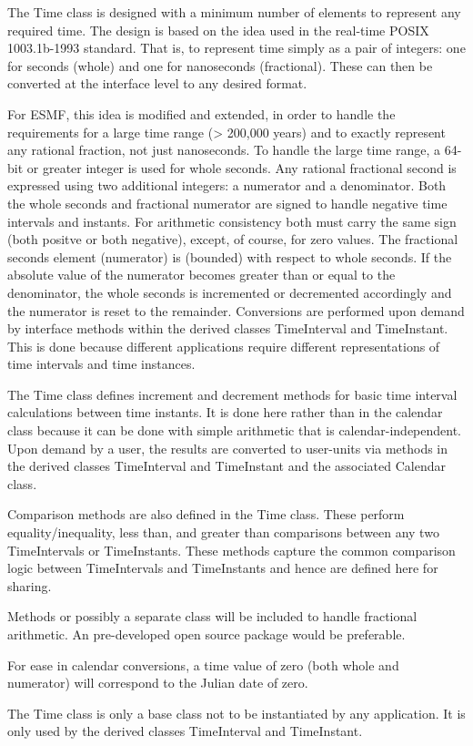 
The Time class is designed with a minimum number of elements to represent
any required time.  The design is based on the idea used in the real-time
POSIX 1003.1b-1993 standard.  That is, to represent time simply as a pair of
integers: one for seconds (whole) and one for nanoseconds (fractional).
These can then be converted at the interface level to any desired format.

For ESMF, this idea is modified and extended, in order to handle the
requirements for a large time range (> 200,000 years) and to exactly
represent any rational fraction, not just nanoseconds.  To handle the
large time range, a 64-bit or greater integer is used for whole seconds.
Any rational fractional second is expressed using two additional integers:
a numerator and a denominator.  Both the whole seconds and fractional numerator
are signed to handle negative time intervals and instants.  For arithmetic
consistency both must carry the same sign (both positve or both negative),
except, of course, for zero values.  The fractional seconds element
(numerator) is  (bounded) with respect
to whole seconds. If the absolute value of the numerator becomes greater
than or equal to the denominator, the whole seconds is incremented or
decremented accordingly and the numerator is reset to the remainder.
Conversions are performed upon demand by interface methods within the
derived classes TimeInterval and TimeInstant.  This is done because
different applications require different representations of time intervals
and time instances.

The Time class defines increment and decrement methods for basic time
interval calculations between time instants.  It is done here rather than in
the calendar class because it can be done with simple arithmetic that is
calendar-independent.  Upon demand by a user, the results are converted to
user-units via methods in the derived classes TimeInterval and TimeInstant
and the associated Calendar class.

Comparison methods are also defined in the Time class.  These perform
equality/inequality, less than, and greater than comparisons between any two
TimeIntervals or TimeInstants.  These methods capture the common comparison
logic between TimeIntervals and TimeInstants and hence are defined here for
sharing.

Methods or possibly a separate class will be included to handle fractional
arithmetic.  An pre-developed open source package would be preferable.

For ease in calendar conversions, a time value of zero (both whole and
numerator) will correspond to the Julian date of zero.  

The Time class is only a base class not to be instantiated by any application.
It is only used by the derived classes TimeInterval and TimeInstant.
